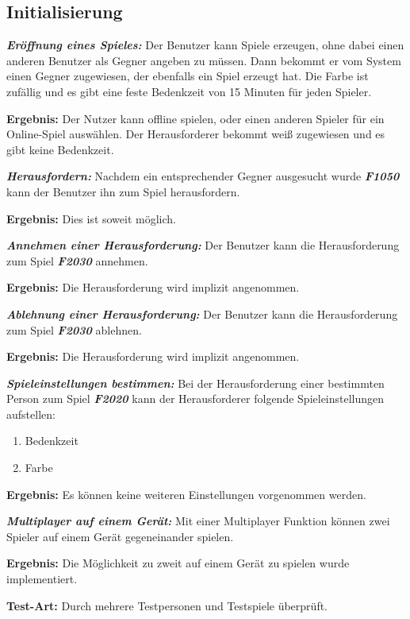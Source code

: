 \documentclass[parskip=full]{scrartcl}
\begin{document}
\subsection{Initialisierung}
\begin{description}
	\hypertarget{F2010}{\item[F2010]}\textbf{\textit{Eröffnung eines Spieles: }} Der Benutzer kann Spiele erzeugen, ohne dabei einen anderen Benutzer als Gegner angeben zu müssen. Dann bekommt er vom System einen Gegner zugewiesen, der ebenfalls ein Spiel erzeugt hat. Die Farbe ist zufällig und es gibt eine feste Bedenkzeit von 15 Minuten für jeden Spieler.
	\item \textbf{Ergebnis: } Der Nutzer kann offline spielen, oder einen anderen Spieler für ein Online-Spiel auswählen. Der Herausforderer bekommt weiß zugewiesen und es gibt keine Bedenkzeit.
	
	\item[F2020] \textbf{\textit{Herausfordern: }} Nachdem ein entsprechender Gegner ausgesucht wurde \textbf{\textit{F1050}} kann der Benutzer ihn zum Spiel herausfordern.
	\item \textbf{Ergebnis: } Dies ist soweit möglich.
	
	\item [F2030] \textbf{\textit{Annehmen einer Herausforderung: }} Der Benutzer kann die Herausforderung zum Spiel \textbf{\textit{F2030}} annehmen.
	\item \textbf{Ergebnis: } Die Herausforderung wird implizit angenommen.
	\item [F2040] \textbf{\textit{Ablehnung einer Herausforderung: }} Der Benutzer kann die Herausforderung zum Spiel \textbf{\textit{F2030}} ablehnen.
	\item \textbf{Ergebnis: } Die Herausforderung wird implizit angenommen.
	
	\item[F2050] \textbf{\textit{Spieleinstellungen bestimmen: }} Bei der Herausforderung einer bestimmten Person zum Spiel \textbf{\textit{F2020}} kann der Herausforderer folgende Spieleinstellungen aufstellen:
	\begin{enumerate}
		\item Bedenkzeit
		\item Farbe
	\end{enumerate}
	\item \textbf{Ergebnis: } Es können keine weiteren Einstellungen vorgenommen werden.
	
	\item[F2060] \textbf{\textit{Multiplayer auf einem Gerät: }}  Mit einer Multiplayer Funktion können zwei Spieler auf einem Gerät gegeneinander spielen.
	\item \textbf{Ergebnis: } Die Möglichkeit zu zweit auf einem Gerät zu spielen wurde implementiert.
	\item \textbf{Test-Art: } Durch mehrere Testpersonen und Testspiele überprüft.
	
	
\end{description}
\end{document}
